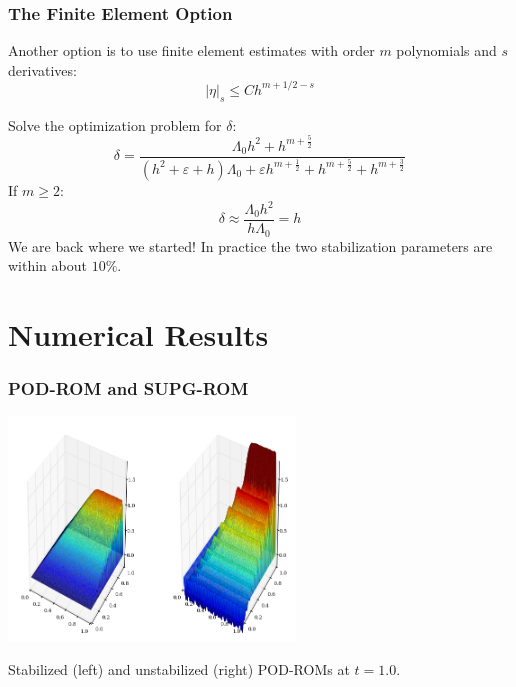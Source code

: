 \documentclass[8pt]{beamer}
\begin{document}
\begin{frame}
    \frametitle{The Finite Element Option}
    Another option is to use finite element estimates \cite{roos2008robust} with
    order \(m\) polynomials and \(s\) derivatives:
    \begin{equation}
        | \eta |_s \leq C h^{m + 1/2 - s}
    \end{equation}

    Solve the optimization problem for \(\delta\):
    \begin{equation}
        \delta = \frac{\Lambda_{0} h^{2} + h^{m + \frac{5}{2}}}{{\left(h^{2}
        + \varepsilon + h\right)} \Lambda_{0} + \varepsilon h^{m + \frac{1}{2}} +
        h^{m + \frac{5}{2}} + h^{m + \frac{3}{2}}}
    \end{equation}
    \pause
    If \(m \geq 2\):
    \begin{equation}
        \delta \approx \dfrac{\Lambda_0 h^2}{h \Lambda_0} = h
    \end{equation}
    We are back where we started! In practice the two stabilization parameters
    are within about \(10\%\).
\end{frame}

\section{Numerical Results}
    \begin{frame}
        \frametitle{POD-ROM and SUPG-ROM}
        \begin{center}
            \includegraphics[width=3in]{Pictures/CDR/codina_rising_wave_10.png}

            Stabilized (left) and unstabilized (right) POD-ROMs at \(t = 1.0\).
        \end{center}
    \end{frame}
\end{document}
